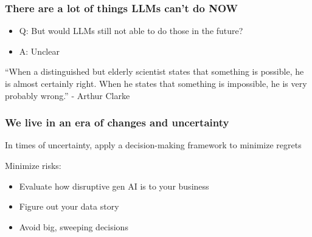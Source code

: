 \begin{frame}[fragile]\frametitle{There are a lot of things LLMs can’t do NOW}

\begin{itemize}
\item Q: But would LLMs still not able to do those in the future?
\item A: Unclear
\end{itemize}	


“When a distinguished but elderly scientist states that something is possible, he is almost 
certainly right. When he states that something is impossible, he is very probably wrong.”
- Arthur Clarke

\end{frame}


\begin{frame}[fragile]\frametitle{We live in an era of changes and uncertainty}

In times of uncertainty, apply a decision-making framework to minimize regrets

Minimize risks:
\begin{itemize}
\item Evaluate how disruptive gen AI is to your business
\item Figure out your data story
\item Avoid big, sweeping decisions
\end{itemize}	

\end{frame}

